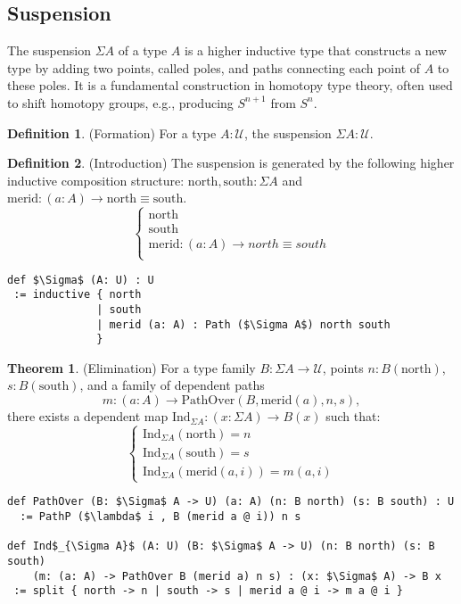 \documentclass{article}
\theoremstyle{definition}
\newtheorem{theorem}{Theorem}
\newtheorem{definition}{Definition}
\begin{document}
\subsection{Suspension}
The suspension $\Sigma A$ of a type $A$ is a higher inductive type that
constructs a new type by adding two points, called poles, and paths connecting
each point of $A$ to these poles. It is a fundamental construction in homotopy
type theory, often used to shift homotopy groups, e.g., producing $S^{n+1}$ from $S^n$.

\begin{definition} (Formation)
For a type $A : \mathcal{U}$, the suspension $\Sigma A : \mathcal{U}$.
\end{definition}

\begin{definition} (Introduction)
The suspension is generated by the following higher inductive composition structure:
$\text{north},\text{south} : \Sigma A$ and $\text{merid} : (a : A) \to \text{north} \equiv \text{south}$.
\[
\begin{cases}
\text{north} \\
\text{south} \\
\text{merid} : (a : A) \rightarrow north \equiv south \\
\end{cases}
\]
\begin{lstlisting}[mathescape=true]
def $\Sigma$ (A: U) : U
 := inductive { north
              | south
              | merid (a: A) : Path ($\Sigma A$) north south
              }
\end{lstlisting}
\end{definition}

\begin{theorem} (Elimination)
For a type family $B : \Sigma A \to \mathcal{U}$, points $n : B(\text{north})$, $s : B(\text{south})$, and a family of
dependent paths
$$
  m : (a : A) \to \text{PathOver}(B,\text{merid}(a),n,s),
$$
there exists a dependent map $\text{Ind}_{\Sigma A} : (x : \Sigma A) \to B(x)$ such that:
\[
\begin{cases}
\text{Ind}_{\Sigma A}(\text{north}) = n \\
\text{Ind}_{\Sigma A}(\text{south}) = s \\
\text{Ind}_{\Sigma A}(\text{merid}(a,i)) = m(a,i)
\end{cases}
\]
\begin{lstlisting}[mathescape=true]
def PathOver (B: $\Sigma$ A -> U) (a: A) (n: B north) (s: B south) : U
  := PathP ($\lambda$ i , B (merid a @ i)) n s

def Ind$_{\Sigma A}$ (A: U) (B: $\Sigma$ A -> U) (n: B north) (s: B south)
    (m: (a: A) -> PathOver B (merid a) n s) : (x: $\Sigma$ A) -> B x
 := split { north -> n | south -> s | merid a @ i -> m a @ i }
\end{lstlisting}
\end{theorem}
\end{document}
